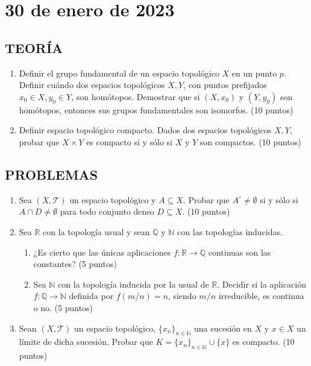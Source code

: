 \newpage

\section{30 de enero de 2023}

\subsection*{TEORÍA}
\begin{enumerate}
    \item Definir el grupo fundamental de un espacio topológico $X$ en un punto $p$. Definir cuándo dos espacios topológicos $X, Y$, con puntos prefijados $x_0 \in X, y_0 \in Y$, son homótopos. Demostrar que si $(X, x_0)$ y $(Y, y_0)$ son homótopos, entonces sus grupos fundamentales son isomorfos. \hfill (10 puntos)
    \item Definir espacio topológico compacto. Dados dos espacios topológicos $X, Y$, probar que $X \times Y$ es compacto si y sólo si $X$ y $Y$ son compactos. \hfill (10 puntos)
\end{enumerate}

\subsection*{PROBLEMAS}
\begin{enumerate}
    \item Sea $(X, \mathcal{T})$ un espacio topológico y $A \subseteq X$. Probar que $A^\circ \neq \emptyset$ si y sólo si $A \cap D \neq \emptyset$ para todo conjunto denso $D \subseteq X$. \hfill (10 puntos)
    \item Sea $\mathbb{R}$ con la topología usual y sean $\mathbb{Q}$ y $\mathbb{N}$ con las topologías inducidas.
    \begin{enumerate}[label=(\alph*)]
        \item ¿Es cierto que las únicas aplicaciones $f: \mathbb{R} \to \mathbb{Q}$ continuas son las constantes? \hfill (5 puntos)
        \item Sea $\mathbb{N}$ con la topología inducida por la usual de $\mathbb{R}$. Decidir si la aplicación $f: \mathbb{Q} \to \mathbb{N}$ definida por $f(m/n) = n$, siendo $m/n$ irreducible, es continua o no. \hfill (5 puntos)
    \end{enumerate}
    \item Sean $(X, \mathcal{T})$ un espacio topológico, $\{x_n\}_{n \in \mathbb{N}}$ una sucesión en $X$ y $x \in X$ un límite de dicha sucesión. Probar que $K = \{x_n\}_{n \in \mathbb{N}} \cup \{x\}$ es compacto. \hfill (10 puntos)
\end{enumerate}

